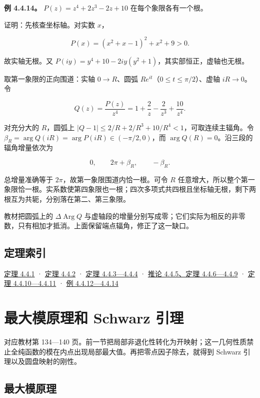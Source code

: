 \documentclass[11pt,a4paper]{article}
\begin{document}
\textbf{例 4.4.14。} \(P(z)=z^4+2z^3-2z+10\) 在每个象限各有一个根。

证明：先核查坐标轴。对实数 \(x\)，

\[
P(x)=(x^2+x-1)^2+x^2+9>0.
\]

故实轴无根。又 \(P(iy)=y^4+10-2iy(y^2+1)\)，其实部恒正，虚轴也无根。

取第一象限的正向围道：实轴 \(0\to R\)、圆弧
\(Re^{it}\)（\(0\le t\le\pi/2\)）、虚轴 \(iR\to0\)。令

\[
Q(z)=\frac{P(z)}{z^4}=1+\frac2z-\frac2{z^3}+\frac{10}{z^4}.
\]

对充分大的 \(R\)，圆弧上
\(|Q-1|\le2/R+2/R^3+10/R^4<1\)，可取连续主辐角。令
\(\beta_R=\arg Q(iR)=\arg P(iR)\in(-\pi/2,0)\)，而
\(\arg Q(R)=0\)。沿三段的辐角增量依次为

\[
0,\qquad 2\pi+\beta_R,\qquad-\beta_R.
\]

总增量准确等于 \(2\pi\)，故第一象限围道内恰一根。可令 \(R\)
任意增大，所以整个第一象限恰一根。实系数使第四象限也一根；四次多项式共四根且坐标轴无根，剩下两根互为共轭，分别落在第二、第三象限。

教材把圆弧上的 \(\Delta\operatorname{Arg}Q\)
与虚轴段的增量分别写成零；它们实际为相反的非零数，只有相加才抵消。上面保留端点辐角，修正了这一缺口。

\subsection{定理索引}\label{ch04-s4-heading-7}

\hyperref[ch04-s4-heading-1]{定理 4.4.1} · \hyperref[ch04-s4-heading-2]{定理 4.4.2} ·
\hyperref[ch04-s4-heading-3]{定理 4.4.3---4.4.4} · \hyperref[ch04-s4-heading-4]{推论
4.4.5、定理 4.4.6---4.4.9} · \hyperref[ch04-s4-heading-5]{定理 4.4.10---4.4.11}
· \hyperref[ch04-s4-heading-6]{例 4.4.12---4.4.14}

\section{最大模原理和 Schwarz 引理}
对应教材第 134---140
页。前一节把局部非退化性转化为开映射；这一几何性质禁止全纯函数的模在内点出现局部最大值。再把零点因子除去，就得到
Schwarz 引理以及圆盘映射的刚性。

\subsection{最大模原理}\label{ch04-s5-heading-1}
\end{document}
